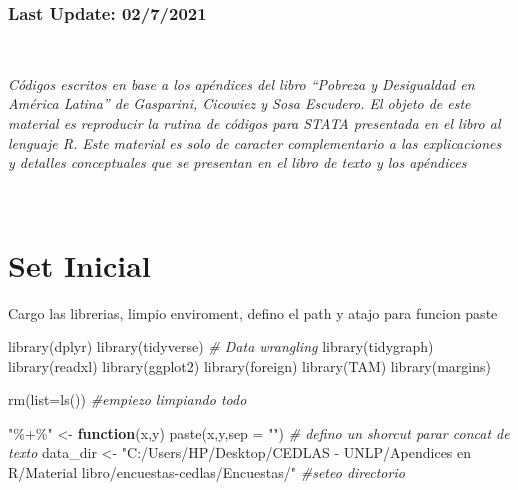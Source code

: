 \documentclass[
]{book}
\newenvironment{Shaded}{\begin{snugshade}}{\end{snugshade}}
\newcommand{\AttributeTok}[1]{\textcolor[rgb]{0.77,0.63,0.00}{#1}}
\newcommand{\CommentTok}[1]{\textcolor[rgb]{0.56,0.35,0.01}{\textit{#1}}}
\newcommand{\ControlFlowTok}[1]{\textcolor[rgb]{0.13,0.29,0.53}{\textbf{#1}}}
\newcommand{\FunctionTok}[1]{\textcolor[rgb]{0.00,0.00,0.00}{#1}}
\newcommand{\NormalTok}[1]{#1}
\newcommand{\OtherTok}[1]{\textcolor[rgb]{0.56,0.35,0.01}{#1}}
\newcommand{\StringTok}[1]{\textcolor[rgb]{0.31,0.60,0.02}{#1}}
\begin{document}
\hypertarget{last-update-0272021-2}{%
\subsubsection*{Last Update: 02/7/2021}\label{last-update-0272021-2}}

~

\emph{Códigos escritos en base a los apéndices del libro ``Pobreza y Desigualdad en América Latina'' de Gasparini, Cicowiez y Sosa Escudero. El objeto de este material es reproducir la rutina de códigos para STATA presentada en el libro al lenguaje R. Este material es solo de caracter complementario a las explicaciones y detalles conceptuales que se presentan en el libro de texto y los apéndices}

~

\hypertarget{set-inicial-3}{%
\section*{Set Inicial}\label{set-inicial-3}}

Cargo las librerias, limpio enviroment, defino el path y atajo para funcion paste

\begin{Shaded}
\begin{Highlighting}[]
\FunctionTok{library}\NormalTok{(dplyr)}
\FunctionTok{library}\NormalTok{(tidyverse) }\CommentTok{\# Data wrangling}
\FunctionTok{library}\NormalTok{(tidygraph)}
\FunctionTok{library}\NormalTok{(readxl)}
\FunctionTok{library}\NormalTok{(ggplot2)}
\FunctionTok{library}\NormalTok{(foreign)}
\FunctionTok{library}\NormalTok{(TAM)}
\FunctionTok{library}\NormalTok{(margins)}

\FunctionTok{rm}\NormalTok{(}\AttributeTok{list=}\FunctionTok{ls}\NormalTok{())    }\CommentTok{\#empiezo limpiando todo }

\StringTok{"\%+\%"} \OtherTok{\textless{}{-}} \ControlFlowTok{function}\NormalTok{(x,y) }\FunctionTok{paste}\NormalTok{(x,y,}\AttributeTok{sep =} \StringTok{""}\NormalTok{)      }\CommentTok{\# defino un shorcut parar concat de texto}
\NormalTok{data\_dir }\OtherTok{\textless{}{-}} \StringTok{"C:/Users/HP/Desktop/CEDLAS {-} UNLP/Apendices en R/Material libro/encuestas{-}cedlas/Encuestas/"}  \CommentTok{\#seteo directorio }
\end{Highlighting}
\end{Shaded}
\end{document}
